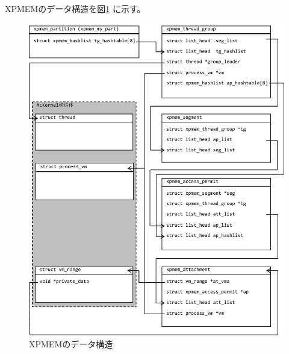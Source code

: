 \documentclass[twoside,11pt,fleqn]{book}
\begin{document}
XPMEMのデータ構造を図\ref{figure:xpmem_struct} に示す。
\begin{figure}[ht]
  \includegraphics[width=0.9\linewidth]{figs/xpmem_struct.pdf}
  \caption{XPMEMのデータ構造}
  \label{figure:xpmem_struct}
\end{figure}
\FloatBarrier
\end{document}
